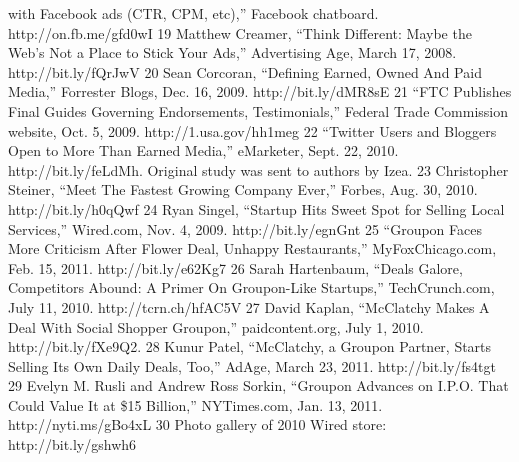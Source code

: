 with Facebook ads (CTR, CPM, etc),'' Facebook chatboard. http://on.fb.me/gfd0wI
19 Matthew Creamer, ``Think Different: Maybe the Web's Not a Place to Stick Your Ads,''
Advertising Age, March 17, 2008. http://bit.ly/fQrJwV
20 Sean Corcoran, ``Defining Earned, Owned And Paid Media,'' Forrester Blogs, Dec. 16, 2009.
http://bit.ly/dMR8sE
21 ``FTC Publishes Final Guides Governing Endorsements, Testimonials,'' Federal Trade
Commission website, Oct. 5, 2009. http://1.usa.gov/hh1meg
22 ``Twitter Users and Bloggers Open to More Than Earned Media,'' eMarketer, Sept. 22, 2010.
http://bit.ly/feLdMh. Original study was sent to authors by Izea.
23 Christopher Steiner, ``Meet The Fastest Growing Company Ever,'' Forbes, Aug. 30, 2010.
http://bit.ly/h0qQwf
24 Ryan Singel, ``Startup Hits Sweet Spot for Selling Local Services,'' Wired.com, Nov. 4, 2009.
http://bit.ly/egnGnt
25 ``Groupon Faces More Criticism After Flower Deal, Unhappy Restaurants,''
MyFoxChicago.com, Feb. 15, 2011. http://bit.ly/e62Kg7
26 Sarah Hartenbaum, ``Deals Galore, Competitors Abound: A Primer On Groupon-Like
Startups,'' TechCrunch.com, July 11, 2010. http://tcrn.ch/hfAC5V
27 David Kaplan, ``McClatchy Makes A Deal With Social Shopper Groupon,'' paidcontent.org,
July 1, 2010. http://bit.ly/fXe9Q2.
28 Kunur Patel, ``McClatchy, a Groupon Partner, Starts Selling Its Own Daily Deals, Too,'' AdAge,
March 23, 2011. http://bit.ly/fs4tgt
29 Evelyn M. Rusli and Andrew Ross Sorkin, ``Groupon Advances on I.P.O. That Could Value
It at \$15 Billion,'' NYTimes.com, Jan. 13, 2011. http://nyti.ms/gBo4xL
30 Photo gallery of 2010 Wired store: http://bit.ly/gshwh6


